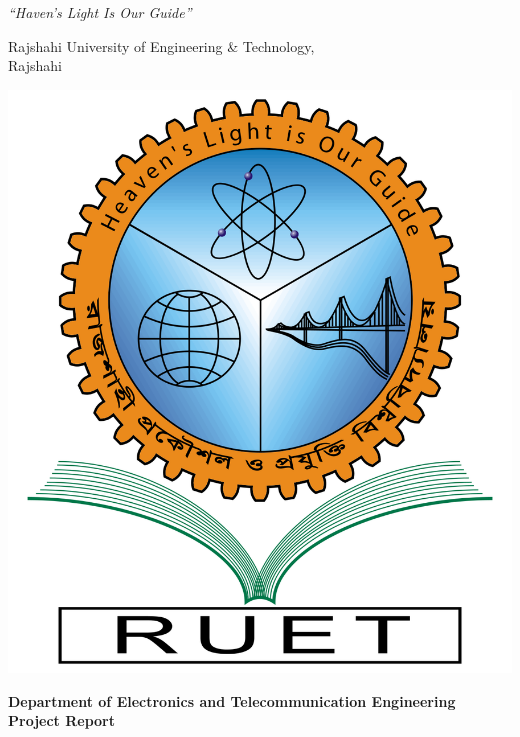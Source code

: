 
\begin{titlepage}
    \begin{center}
        \textit{``Haven's Light Is Our Guide''}\\

        \vspace{0.25cm}

        \begin{huge}
            Rajshahi University of Engineering \& Technology,\\
            Rajshahi\\
        \end{huge}

        \vspace{0.5cm}

        \includegraphics[scale=.18]{images/ruet_logo.png}
        \\
        \vspace{.5cm}

        \begin{Large}
            \textbf{Department of Electronics and Telecommunication Engineering}\\
            \huge
            \textbf{Project Report} \\
        \end{Large}


\end{center}
\end{titlepage}
